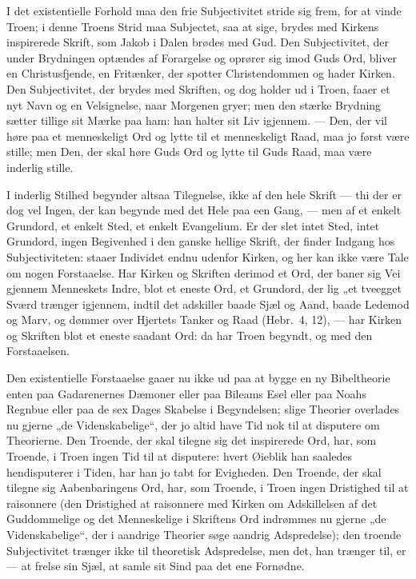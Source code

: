 \documentclass[12pt,a4paper]{book}
\newcommand{\opage}[1]{\marginnote{\footnotesize\textit{[#1]}}}
\begin{document}
I det existentielle Forhold maa den frie Subjectivitet stride sig frem, for at
vinde Troen; i denne Troens Strid maa Subjectet, saa at sige, brydes med Kirkens
inspirerede Skrift, som Jakob i Dalen brødes med Gud. Den Subjectivitet, der
under Brydningen optændes af Forargelse og oprører sig imod Guds Ord, bliver en
Christusfjende, en Fritænker, der spotter Christendommen og hader Kirken. Den
Subjectivitet, der brydes med Skriften, og dog holder ud i Troen, faaer et nyt
Navn og en Velsignelse, naar Morgenen gryer; men den stærke Brydning sætter
tillige sit Mærke paa ham: han halter sit Liv igjennem. --- Den, der vil høre
paa et menneskeligt Ord og lytte til et menneskeligt Raad, maa jo først være
stille; men Den, der skal høre Guds Ord og lytte til Guds Raad, maa være
inderlig stille.

I inderlig Stilhed begynder altsaa Tilegnelse, ikke af den hele Skrift --- thi
der er dog vel Ingen, der kan begynde med det Hele paa een Gang, --- men af et
enkelt Grundord, et enkelt Sted, et enkelt Evangelium. Er der slet intet Sted,
intet Grundord, ingen Begivenhed i den ganske hellige Skrift, der finder Indgang
hos Subjectiviteten: staaer Individet endnu udenfor Kirken, og her kan ikke være
Tale om nogen Forstaaelse. Har Kirken og Skriften derimod et Ord, der baner sig
Vei gjennem Menneskets Indre, blot et eneste Ord, et Grundord, der lig „et
tveegget Sværd trænger igjennem, indtil det adskiller baade Sjæl
\opage{155} %
og Aand, baade Ledemod og Marv, og dømmer over Hjertets Tanker og Raad
(Hebr.\ 4, 12), --- har Kirken og Skriften blot et eneste saadant Ord: da har
Troen begyndt, og med den Forstaaelsen.

Den existentielle Forstaaelse gaaer nu ikke ud paa at bygge en ny Bibeltheorie
enten paa Gadarenernes Dæmoner eller paa Bileams Esel eller paa Noahs Regnbue
eller paa de sex Dages Skabelse i Begyndelsen; slige Theorier overlades nu
gjerne „de Videnskabelige“, der jo altid have Tid nok til at disputere om
Theorierne. Den Troende, der skal tilegne sig det inspirerede Ord, har, som
Troende, i Troen ingen Tid til at disputere: hvert Øieblik han saaledes
hendisputerer i Tiden, har han jo tabt for Evigheden. Den Troende, der skal
tilegne sig Aabenbaringens Ord, har, som Troende, i Troen ingen Dristighed til
at raisonnere (den Dristighed at raisonnere med Kirken om Adskillelsen af det
Guddommelige og det Menneskelige i Skriftens Ord indrømmes nu gjerne „de
Videnskabelige“, der i aandrige Theorier søge aandrig Adspredelse); den troende
Subjectivitet trænger ikke til theoretisk Adspredelse, men det, han trænger til,
er --- at frelse sin Sjæl, at samle sit Sind paa det ene Fornødne.
\end{document}
